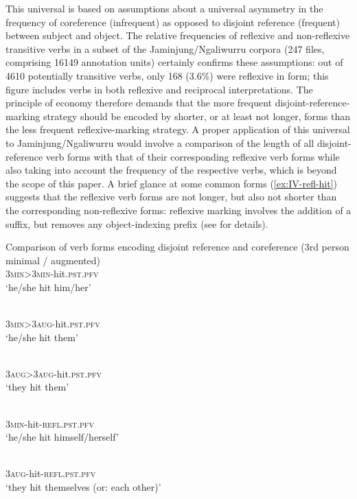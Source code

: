 \documentclass[output=paper,colorlinks,citecolor=brown]{langscibook}
\begin{document}
This universal is based on assumptions about a universal asymmetry in the frequency of coreference (infrequent) as opposed to disjoint reference (frequent) between subject and object. The relative frequencies of reflexive and non-reflexive transitive verbs in a subset of the Jaminjung/Ngaliwurru corpora (247 files, comprising 16149 annotation units) certainly confirms these assumptions: out of 4610 potentially transitive verbs, only 168 (3.6\%) were reflexive in form; this figure includes verbs in both reflexive and reciprocal interpretations. The principle of economy therefore demands that the more frequent disjoint-reference-marking strategy should be encoded by shorter, or at least not longer, forms than the less frequent reflexive-marking strategy. A proper application of this universal to Jaminjung/Ngaliwurru would involve a comparison of the length of all disjoint-reference verb forms with that of their corresponding reflexive verb forms while also taking into account the frequency of the respective verbs, which is beyond the scope of this paper. A brief glance at some common forms (\ref{ex:IV-refl-hit}) suggests that the reflexive verb forms are not longer, but also not shorter than the corresponding non-reflexive forms: reflexive marking involves the addition of a suffix, but removes any object-indexing prefix (see  for details). 

\ea Comparison of verb forms encoding disjoint reference and coreference (3rd person minimal / augmented)
\label{ex:IV-refl-hit}
\ea
{}\\
\textsc{3min>3min}-hit.\textsc{pst.pfv}\\ 
\glt `he/she hit him/her'

\ex
{}\\
\textsc{3min>3aug}-hit.\textsc{pst.pfv}\\ 
\glt `he/she hit them'

\ex
{}\\
\textsc{3aug>3aug}-hit.\textsc{pst.pfv}\\ 
\glt `they hit them'

\ex
{}\\
\textsc{3min}-hit-\textsc{refl.pst.pfv}\\ 
\glt `he/she hit himself/herself'

\ex
{}\\
\textsc{3aug}-hit-\textsc{refl.pst.pfv}\\ 
\glt `they hit themselves (or: each other)'
\z
\z
\end{document}
